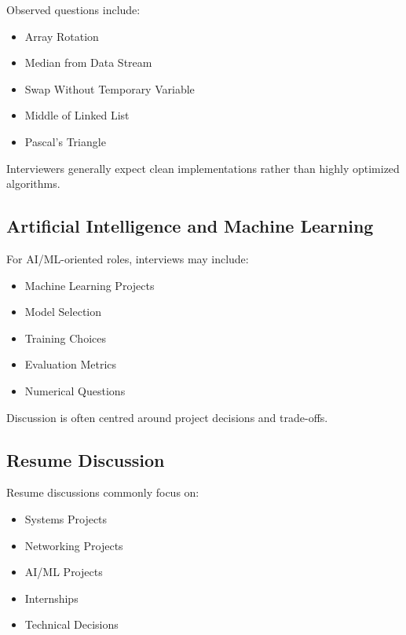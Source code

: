 \documentclass[11pt,a4paper]{article}
\begin{document}
Observed questions include:

\begin{itemize}
	\item Array Rotation
	\item Median from Data Stream
	\item Swap Without Temporary Variable
	\item Middle of Linked List
	\item Pascal's Triangle
\end{itemize}

Interviewers generally expect clean implementations rather than highly optimized algorithms.


\subsection{Artificial Intelligence and Machine Learning}

For AI/ML-oriented roles, interviews may include:

\begin{itemize}
	\item Machine Learning Projects
	\item Model Selection
	\item Training Choices
	\item Evaluation Metrics
	\item Numerical Questions
\end{itemize}

Discussion is often centred around project decisions and trade-offs.


\subsection{Resume Discussion}

Resume discussions commonly focus on:

\begin{itemize}
	\item Systems Projects
	\item Networking Projects
	\item AI/ML Projects
	\item Internships
	\item Technical Decisions
\end{itemize}
\end{document}

